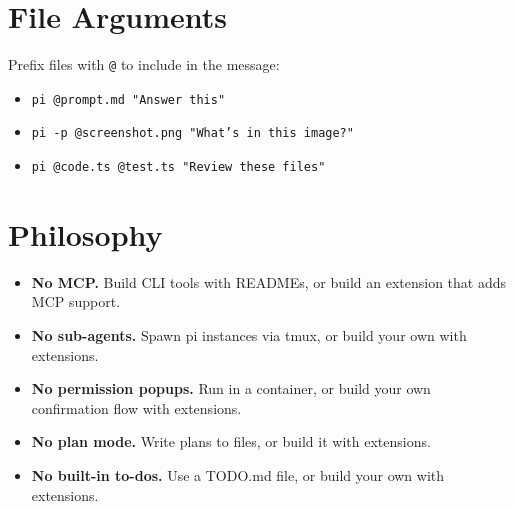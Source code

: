 \documentclass[12pt]{article}
\begin{document}
\section{File Arguments}

Prefix files with \texttt{@} to include in the message:
\begin{itemize}
    \item \texttt{pi @prompt.md "Answer this"}
    \item \texttt{pi -p @screenshot.png "What's in this image?"}
    \item \texttt{pi @code.ts @test.ts "Review these files"}
\end{itemize}

\section{Philosophy}

\begin{itemize}
    \item \textbf{No MCP.} Build CLI tools with READMEs, or build an extension that adds MCP support.
    \item \textbf{No sub-agents.} Spawn pi instances via tmux, or build your own with extensions.
    \item \textbf{No permission popups.} Run in a container, or build your own confirmation flow with extensions.
    \item \textbf{No plan mode.} Write plans to files, or build it with extensions.
    \item \textbf{No built-in to-dos.} Use a TODO.md file, or build your own with extensions.
\end{itemize}
\end{document}
